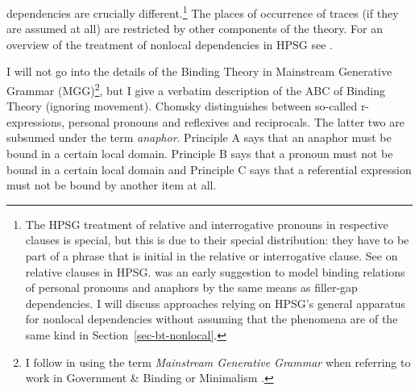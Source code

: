 \documentclass[output=paper
 	        ,biblatex
                ,babelshorthands
                ,newtxmath
                ,draftmode
                ,colorlinks, citecolor=brown
]{langscibook}
\begin{document}
dependencies are crucially different.\footnote{\label{binding-fn-percolation-of-indices}%
The HPSG treatment of relative and interrogative pronouns in respective clauses is special, but this
is due to their special distribution: they have to be part of a phrase that is initial in the
relative or interrogative clause. 
See  on relative
clauses in HPSG. %
 was an early suggestion to model binding relations of personal pronouns and anaphors by
the same means as filler-gap dependencies. I will discuss approaches relying on HPSG's general apparatus
for nonlocal dependencies without assuming that the phenomena are of the same kind in Section~\ref{sec-bt-nonlocal}. 
} The places of occurrence of traces (if they are assumed at all)
are restricted by other components of the theory. For an overview of the treatment of nonlocal
dependencies in HPSG see .

I will not go into the details of the Binding Theory in Mainstream Generative Grammar
(MGG)\footnote{
I follow \citet[]{CJ2005a} in using the term \emph{Mainstream Generative Grammar} when
referring to work in Government \& Binding\indexgb \citep{Chomsky81a} or Minimalism \citep{Chomsky95a-u}.}, but I
give a verbatim description of the ABC of Binding Theory (ignoring movement). Chomsky distinguishes between
so-called r-expressions, personal
pronouns and reflexives and reciprocals. The latter two are subsumed under the term \emph{anaphor}. 
Principle A says that an anaphor must be bound in a certain local domain. Principle B says that a
pronoun must not be bound in a certain local domain and Principle C says that a referential
expression must not be bound by another item at all.
\end{document}
